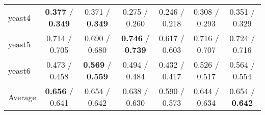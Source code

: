 \begin{table*}[ht]
\begin{tabular}{l|@{\hskip3pt}c@{\hskip3pt}|@{\hskip3pt}c@{\hskip3pt}|@{\hskip3pt}c@{\hskip3pt}|@{\hskip3pt}c@{\hskip3pt}|@{\hskip3pt}c@{\hskip3pt}|@{\hskip3pt}c@{\hskip3pt}}
\tabularnewline
yeast4 &  \textbf{0.377}  /  \textbf{0.349}  &  0.371  /  \textbf{0.349}  &  0.275  /  0.260  &  0.246  /  0.218  &  0.308  /  0.293  &  0.351  /  0.329 
\tabularnewline
yeast5 &  0.714  /  0.705  &  0.690  /  0.680  &  \textbf{0.746}  /  \textbf{0.739}  &  0.617  /  0.603  &  0.716  /  0.707  &  0.724  /  0.716 
\tabularnewline
yeast6 &  0.473  /  0.458  &  \textbf{0.569}  /  \textbf{0.559}  &  0.494  /  0.484  &  0.432  /  0.417  &  0.526  /  0.517  &  0.564  /  0.554 
\tabularnewline
\hline Average &  \textbf{0.656}  /  0.641  &  0.654  /  0.642  &  0.638  /  0.630  &  0.590  /  0.573  &  0.644  /  0.634  &  0.654  /  \textbf{0.642} 
\tabularnewline
\hline\end{tabular}\end{table*}



